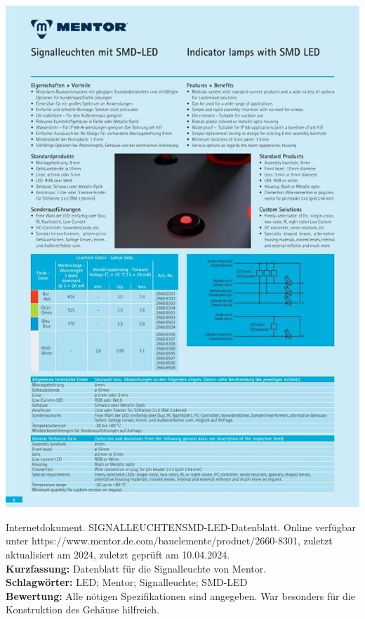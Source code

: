 {
\begin{minipage}{0.38\textwidth}
	\includegraphics[width=\linewidth]{images/Mentor.jpg}
\end{minipage}
\hfill
\begin{minipage}{0.6\textwidth}
Internetdokument. SIGNALLEUCHTENSMD-LED-Datenblatt.
Online verfügbar unter https://www.mentor.de.com/bauelemente/product/2660-8301, zuletzt aktualisiert am 2024, zuletzt geprüft am 10.04.2024.	
\\ \textbf{Kurzfassung:}
Datenblatt für die  Signalleuchte von Mentor.
\\ \textbf{Schlagwörter:}
LED; Mentor; Signalleuchte; SMD-LED
\\ \textbf{Bewertung:}
Alle nötigen Spezifikationen sind angegeben. War besonders für die Konstruktion des Gehäuse hilfreich.
\end{minipage}
}

